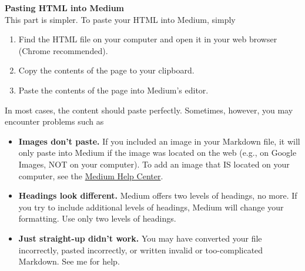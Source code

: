 \documentclass[]{book}
\providecommand{\tightlist}{%
  \setlength{\itemsep}{0pt}\setlength{\parskip}{0pt}}
\theoremstyle{definition}
\theoremstyle{definition}
\theoremstyle{definition}
\theoremstyle{remark}
\begin{document}
\textbf{Pasting HTML into Medium}\\
This part is simpler. To paste your HTML into Medium, simply

\begin{enumerate}
\def\labelenumi{\arabic{enumi}.}
\tightlist
\item
  Find the HTML file on your computer and open it in your web browser
  (Chrome recommended).
\item
  Copy the contents of the page to your clipboard.
\item
  Paste the contents of the page into Medium's editor.
\end{enumerate}

In most cases, the content should paste perfectly. Sometimes, however,
you may encounter problems such as

\begin{itemize}
\tightlist
\item
  \textbf{Images don't paste.} If you included an image in your Markdown
  file, it will only paste into Medium if the image was located on the
  web (e.g., on Google Images, NOT on your computer). To add an image
  that IS located on your computer, see the
  \href{https://help.medium.com/hc/en-us/articles/215679797}{Medium Help
  Center}.
\item
  \textbf{Headings look different.} Medium offers two levels of
  headings, no more. If you try to include additional levels of
  headings, Medium will change your formatting. Use only two levels of
  headings.
\item
  \textbf{Just straight-up didn't work.} You may have converted your
  file incorrectly, pasted incorrectly, or written invalid or
  too-complicated Markdown. See me for help.
\end{itemize}


\end{document}
